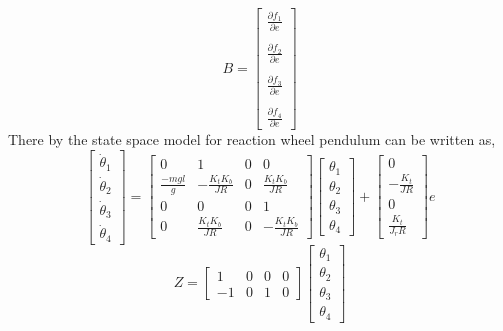 \documentclass[a4paper]{article}
\begin{document}
\begin{equation}
B = \left[\begin{array}{c}
\frac{\partial f_1}{\partial e}\\ 
\\
\frac{\partial f_2}{\partial e}\\ 
\\
\frac{\partial f_3}{\partial e}\\ 
\\
\frac{\partial f_4}{\partial e}
\end{array}\right]
\end{equation}
There by the state space model for reaction wheel pendulum can be written as,
\begin{equation}
\left[\begin{array}{c}
\dot \theta_1\\ 
\dot \theta_2\\ 
\dot \theta_3\\ 
\dot \theta_4
\end{array}\right] = \left[\begin{array}{cccc}
0& 1 & 0  &0  \\ 
\frac{-mgl}{g}& -\frac{K_tK_b}{JR} & 0 & \frac{K_tK_b}{JR}  \\ 
0& 0 & 0 & 1  \\ 
0 & \frac{K_tK_b}{JR}  & 0 &-\frac{K_tK_b}{JR}
\end{array} \right]\left[\begin{array}{c}
\theta_1\\ 
\theta_2\\ 
\theta_3\\ 
\theta_4
\end{array}\right] + \left[\begin{array}{c}
0\\ 
-\frac{K_t}{JR}\\ 
0\\ 
\frac{K_t}{J_rR}
\end{array}\right]e
\end{equation} 
\begin{equation}
Z = \left[\begin{array}{cccc}
1 & 0 & 0 & 0  \\ 
-1& 0 & 1 & 0 
\end{array} \right]\left[\begin{array}{c}
\theta_1\\ 
\theta_2\\ 
\theta_3\\ 
\theta_4
\end{array}\right]
\end{equation}
\end{document}
